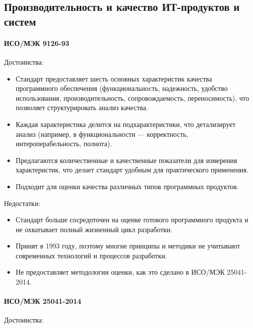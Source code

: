 


\subsection{Производительность и качество ИТ-продуктов и систем}

\paragraph{ИСО/МЭК 9126-93}

Достоинства:

\begin{itemize}
	\item Стандарт предоставляет шесть основных характеристик
		качества программного обеспечения (функциональность, надежность,
		удобство использования, производительность,
		сопровождаемость, переносимость),
		что позволяет структурировать анализ качества.
	\item Каждая характеристика делится на подхарактеристики,
		что детализирует анализ (например,
		в функциональности --- корректность, интероперабельность, полнота).
	\item Предлагаются количественные и качественные показатели
		для измерения характеристик,
		что делает стандарт удобным для практического применения.
	\item Подходит для оценки качества различных типов программных продуктов.
\end{itemize}

Недостатки:

\begin{itemize}
	\item Стандарт больше сосредоточен на оценке готового программного продукта
		и не охватывает полный жизненный цикл разработки.
	\item Принят в 1993 году, поэтому многие принципы
		и методики не учитывают современных технологий
		и процессов разработки.
	\item Не предоставляет методологии оценки,
		как это сделано в ИСО/МЭК 25041-2014.
\end{itemize}

\paragraph{ИСО/МЭК 25041-2014}

Достоинства:

